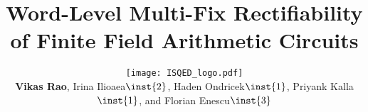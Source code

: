 \documentclass[xcolor=dvipsnames]{beamer}
\begin{document}
\title[]{Word-Level Multi-Fix Rectifiability of Finite Field Arithmetic Circuits}

\author[]{
\texttt{[image: ISQED\_logo.pdf]}\\
 {\bf Vikas Rao}, Irina Ilioaea$\inst{2}$, Haden Ondricek$\inst{1}$, Priyank Kalla$\inst{1}$,  and Florian Enescu$\inst{3}$} 
\date{}




\begin{frame}[plain]
  \titlepage
\end{frame}










% 


\end{document}
